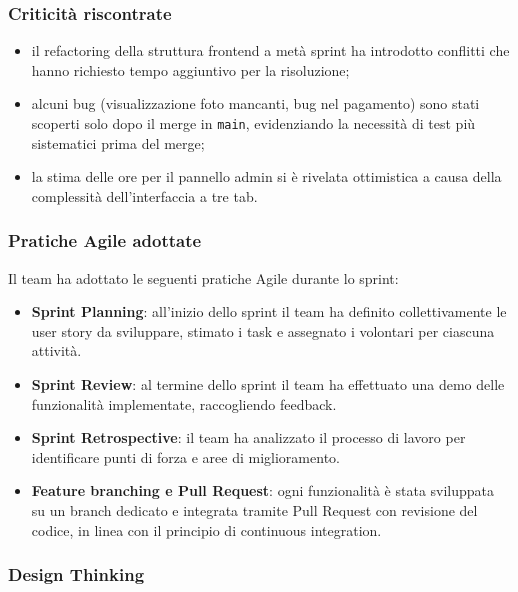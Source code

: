 \documentclass[a4paper,12pt]{article}
\begin{document}
\subsubsection{Criticità riscontrate}

\begin{itemize}
  \item il refactoring della struttura frontend a metà sprint ha introdotto conflitti
        che hanno richiesto tempo aggiuntivo per la risoluzione;
  \item alcuni bug (visualizzazione foto mancanti, bug nel pagamento) sono stati
        scoperti solo dopo il merge in \texttt{main}, evidenziando la necessità di
        test più sistematici prima del merge;
  \item la stima delle ore per il pannello admin si è rivelata ottimistica a causa
        della complessità dell'interfaccia a tre tab.
\end{itemize}

\subsubsection{Pratiche Agile adottate}

Il team ha adottato le seguenti pratiche Agile durante lo sprint:

\begin{itemize}
  \item \textbf{Sprint Planning}: all'inizio dello sprint il team ha definito
        collettivamente le user story da sviluppare, stimato i task e assegnato
        i volontari per ciascuna attività.
  \item \textbf{Sprint Review}: al termine dello sprint il team ha effettuato
        una demo delle funzionalità implementate, raccogliendo feedback.
  \item \textbf{Sprint Retrospective}: il team ha analizzato il processo di lavoro
        per identificare punti di forza e aree di miglioramento.
  \item \textbf{Feature branching e Pull Request}: ogni funzionalità è stata
        sviluppata su un branch dedicato e integrata tramite Pull Request con
        revisione del codice, in linea con il principio di continuous integration.
\end{itemize}

\subsubsection{Design Thinking}
\end{document}
